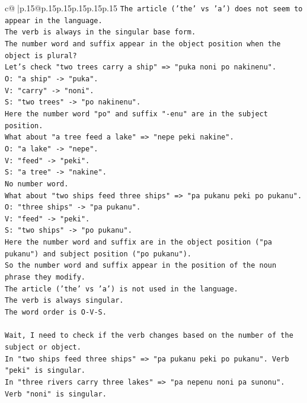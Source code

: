\documentclass{article}
\begin{document}
{\begin{supertabular}{c@{$\;$}|p{.15\linewidth}@{}p{.15\linewidth}p{.15\linewidth}p{.15\linewidth}p{.15\linewidth}p{.15\linewidth}}
{{{\texttt{The article ('the' vs 'a') does not seem to appear in the language.} \\
\texttt{The verb is always in the singular base form.} \\
\texttt{The number word and suffix appear in the object position when the object is plural?} \\
\texttt{Let's check "two trees carry a ship" => "puka noni po nakinenu".} \\
\texttt{O: "a ship" {-}> "puka".} \\
\texttt{V: "carry" {-}> "noni".} \\
\texttt{S: "two trees" {-}> "po nakinenu".} \\
\texttt{Here the number word "po" and suffix "{-}enu" are in the subject position.} \\
\texttt{What about "a tree feed a lake" => "nepe peki nakine".} \\
\texttt{O: "a lake" {-}> "nepe".} \\
\texttt{V: "feed" {-}> "peki".} \\
\texttt{S: "a tree" {-}> "nakine".} \\
\texttt{No number word.} \\
\texttt{What about "two ships feed three ships" => "pa pukanu peki po pukanu".} \\
\texttt{O: "three ships" {-}> "pa pukanu".} \\
\texttt{V: "feed" {-}> "peki".} \\
\texttt{S: "two ships" {-}> "po pukanu".} \\
\texttt{Here the number word and suffix are in the object position ("pa pukanu") and subject position ("po pukanu").} \\
\texttt{So the number word and suffix appear in the position of the noun phrase they modify.} \\
\texttt{The article ('the' vs 'a') is not used in the language.} \\
\texttt{The verb is always singular.} \\
\texttt{The word order is O{-}V{-}S.} \\
\\ 
\texttt{Wait, I need to check if the verb changes based on the number of the subject or object.} \\
\texttt{In "two ships feed three ships" => "pa pukanu peki po pukanu". Verb "peki" is singular.} \\
\texttt{In "three rivers carry three lakes" => "pa nepenu noni pa sunonu". Verb "noni" is singular.} \\
}}}
\end{supertabular}}
\end{document}
